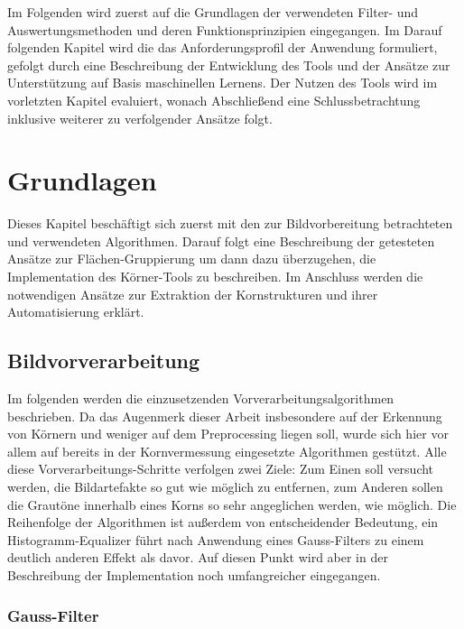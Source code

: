 \documentclass[
  12pt,
]{book}
\begin{document}
Im Folgenden wird zuerst auf die Grundlagen der verwendeten Filter- und Auswertungsmethoden und deren Funktionsprinzipien eingegangen.
Im Darauf folgenden Kapitel wird die das Anforderungsprofil der Anwendung formuliert, gefolgt durch eine Beschreibung der Entwicklung des Tools und der Ansätze zur Unterstützung auf Basis maschinellen Lernens.
Der Nutzen des Tools wird im vorletzten Kapitel evaluiert, wonach Abschließend eine Schlussbetrachtung inklusive weiterer zu verfolgender Ansätze folgt.

\hypertarget{grundlagen}{%
\chapter{Grundlagen}\label{grundlagen}}

Dieses Kapitel beschäftigt sich zuerst mit den zur Bildvorbereitung betrachteten und verwendeten Algorithmen. Darauf folgt eine Beschreibung der getesteten Ansätze zur Flächen-Gruppierung um dann dazu überzugehen, die Implementation des Körner-Tools zu beschreiben.
Im Anschluss werden die notwendigen Ansätze zur Extraktion der Kornstrukturen und ihrer Automatisierung erklärt.

\hypertarget{bildvorverarbeitung}{%
\section{Bildvorverarbeitung}\label{bildvorverarbeitung}}

Im folgenden werden die einzusetzenden Vorverarbeitungsalgorithmen beschrieben. Da das Augenmerk dieser Arbeit insbesondere auf der Erkennung von Körnern und weniger auf dem Preprocessing liegen soll, wurde sich hier vor allem auf bereits in der Kornvermessung eingesetzte Algorithmen gestützt.
Alle diese Vorverarbeitungs-Schritte verfolgen zwei Ziele:
Zum Einen soll versucht werden, die Bildartefakte so gut wie möglich zu entfernen, zum Anderen sollen die Grautöne innerhalb eines Korns so sehr angeglichen werden, wie möglich.
Die Reihenfolge der Algorithmen ist außerdem von entscheidender Bedeutung, ein Histogramm-Equalizer führt nach Anwendung eines Gauss-Filters zu einem deutlich anderen Effekt als davor. Auf diesen Punkt wird aber in der Beschreibung der Implementation noch umfangreicher eingegangen.

\hypertarget{gauss-filter}{%
\subsection{Gauss-Filter}\label{gauss-filter}}
\end{document}
